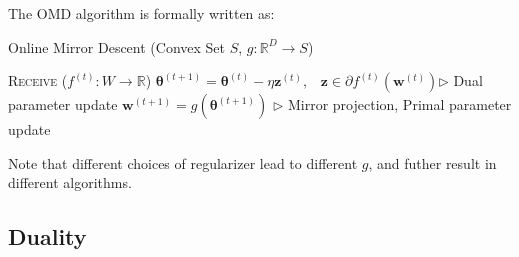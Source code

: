 \documentclass[11pt]{article}
\begin{document}
The OMD algorithm is formally written as:
\begin{algorithm}[H]
\caption{Online Mirror Descent (Convex Set $S$, $g: \mathbb{R}^D \rightarrow S$)}
\label{algo:omd}
\begin{algorithmic}[1]
        \STATE \textsc{Receive} ($f^{(t)}: W \rightarrow \mathbb{R}$)
        \STATE $\bm\theta^{(t+1)} = \bm\theta^{(t)} - \eta \textbf{z}^{(t)}, \;\;\; \textbf{z} \in \partial f^{(t)}(\textbf{w}^{(t)}) $\hfill $\triangleright$ Dual parameter update 
        \STATE $\textbf{w}^{(t+1)} = g(\bm\theta^{(t+1)})$ \hfill $\triangleright$ Mirror projection, Primal parameter update   
    \ENDFOR
\end{algorithmic}
\end{algorithm}
Note that different choices of regularizer lead to different $g$, and futher result in different algorithms.

\subsection{Duality}
\end{document}
